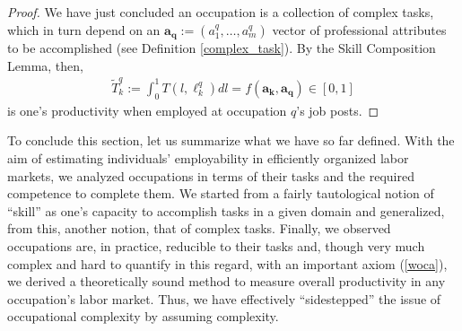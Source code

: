 \documentclass[hidelinks, nonatbib]{elsarticle}
\begin{document}
\begin{proof}
    We have just concluded an occupation is a collection of complex tasks, which in turn depend on an $\boldsymbol{a_q} := (a_{1}^{q},\dots, a_{m}^{q})$ vector of professional attributes to be accomplished (see Definition \ref{complex_task}). By the Skill Composition Lemma, then,
    \begin{gather}
        \tilde{T}_{k}^{q}
        :=
        \int_{0}^{1}
        T(l, \ell_{k}^{q})
        dl
        =
        f(\boldsymbol{a_k}, \boldsymbol{a_q})
        \in
        [0,1]
    \end{gather}
    is one's productivity when employed at occupation $q$'s job posts.
\end{proof}

To conclude this section, let us summarize what we have so far defined. With the aim of estimating individuals' employability in efficiently organized labor markets, we analyzed occupations in terms of their tasks and the required competence to complete them. We started from a fairly tautological notion of ``skill'' as one's capacity to accomplish tasks in a given domain and generalized, from this, another notion, that of complex tasks. Finally, we observed occupations are, in practice, reducible to their tasks and, though very much complex and hard to quantify in this regard, with an important axiom (\ref{woca}), we derived a theoretically sound method to measure overall productivity in any occupation's labor market. Thus, we have effectively ``sidestepped'' the issue of occupational complexity by assuming complexity.
\end{document}
